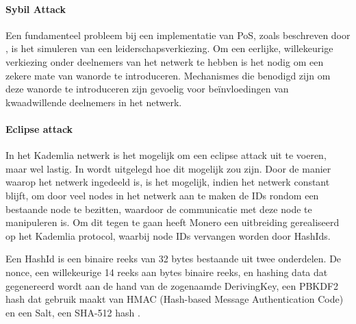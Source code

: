 \paragraph{Sybil Attack}
Een fundamenteel probleem bij een implementatie van \acrshort{PoS}, zoals beschreven door \citep{kiayias2017ouroboros}, is het simuleren van een leiderschapsverkiezing. Om een eerlijke, willekeurige verkiezing onder deelnemers van het netwerk te hebben is het nodig om een zekere mate van wanorde te introduceren. Mechanismes die benodigd zijn om deze wanorde te introduceren zijn gevoelig voor beïnvloedingen van kwaadwillende deelnemers in het netwerk.

\paragraph{Eclipse attack}
In het Kademlia netwerk is het mogelijk om een eclipse attack uit te voeren, maar wel lastig. In \cite{cardano_wiki:csl_app_level} wordt uitgelegd hoe dit mogelijk zou zijn. Door de manier waarop het netwerk ingedeeld is, is het mogelijk, indien het netwerk constant blijft, om door veel nodes in het netwerk aan te maken de IDs rondom een bestaande node te bezitten, waardoor de communicatie met deze node te manipuleren is. Om dit tegen te gaan heeft Monero een uitbreiding gerealiseerd op het Kademlia protocol, waarbij node IDs vervangen worden door HashIds. 

Een HashId is een binaire reeks van 32 bytes bestaande uit twee onderdelen. De nonce, een willekeurige 14 reeks aan bytes binaire reeks, en hashing data dat gegenereerd wordt aan de hand van de zogenaamde DerivingKey, een PBKDF2 hash dat gebruik maakt van HMAC (Hash-based Message Authentication Code) en een Salt, een SHA-512 hash \citep[P2P Layer, Addressing]{cardano_wiki}.
